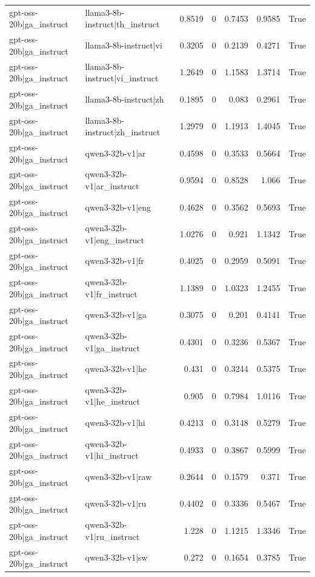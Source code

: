 \begin{table}
\begin{tabular}{l l r r r r l}
gpt-oss-20b|ga_instruct & llama3-8b-instruct|th_instruct & 0.8519 & 0 & 0.7453 & 0.9585 & True \\
gpt-oss-20b|ga_instruct & llama3-8b-instruct|vi & 0.3205 & 0 & 0.2139 & 0.4271 & True \\
gpt-oss-20b|ga_instruct & llama3-8b-instruct|vi_instruct & 1.2649 & 0 & 1.1583 & 1.3714 & True \\
gpt-oss-20b|ga_instruct & llama3-8b-instruct|zh & 0.1895 & 0 & 0.083 & 0.2961 & True \\
gpt-oss-20b|ga_instruct & llama3-8b-instruct|zh_instruct & 1.2979 & 0 & 1.1913 & 1.4045 & True \\
gpt-oss-20b|ga_instruct & qwen3-32b-v1|ar & 0.4598 & 0 & 0.3533 & 0.5664 & True \\
gpt-oss-20b|ga_instruct & qwen3-32b-v1|ar_instruct & 0.9594 & 0 & 0.8528 & 1.066 & True \\
gpt-oss-20b|ga_instruct & qwen3-32b-v1|eng & 0.4628 & 0 & 0.3562 & 0.5693 & True \\
gpt-oss-20b|ga_instruct & qwen3-32b-v1|eng_instruct & 1.0276 & 0 & 0.921 & 1.1342 & True \\
gpt-oss-20b|ga_instruct & qwen3-32b-v1|fr & 0.4025 & 0 & 0.2959 & 0.5091 & True \\
gpt-oss-20b|ga_instruct & qwen3-32b-v1|fr_instruct & 1.1389 & 0 & 1.0323 & 1.2455 & True \\
gpt-oss-20b|ga_instruct & qwen3-32b-v1|ga & 0.3075 & 0 & 0.201 & 0.4141 & True \\
gpt-oss-20b|ga_instruct & qwen3-32b-v1|ga_instruct & 0.4301 & 0 & 0.3236 & 0.5367 & True \\
gpt-oss-20b|ga_instruct & qwen3-32b-v1|he & 0.431 & 0 & 0.3244 & 0.5375 & True \\
gpt-oss-20b|ga_instruct & qwen3-32b-v1|he_instruct & 0.905 & 0 & 0.7984 & 1.0116 & True \\
gpt-oss-20b|ga_instruct & qwen3-32b-v1|hi & 0.4213 & 0 & 0.3148 & 0.5279 & True \\
gpt-oss-20b|ga_instruct & qwen3-32b-v1|hi_instruct & 0.4933 & 0 & 0.3867 & 0.5999 & True \\
gpt-oss-20b|ga_instruct & qwen3-32b-v1|raw & 0.2644 & 0 & 0.1579 & 0.371 & True \\
gpt-oss-20b|ga_instruct & qwen3-32b-v1|ru & 0.4402 & 0 & 0.3336 & 0.5467 & True \\
gpt-oss-20b|ga_instruct & qwen3-32b-v1|ru_instruct & 1.228 & 0 & 1.1215 & 1.3346 & True \\
gpt-oss-20b|ga_instruct & qwen3-32b-v1|sw & 0.272 & 0 & 0.1654 & 0.3785 & True \\

\end{tabular}
\end{table}
